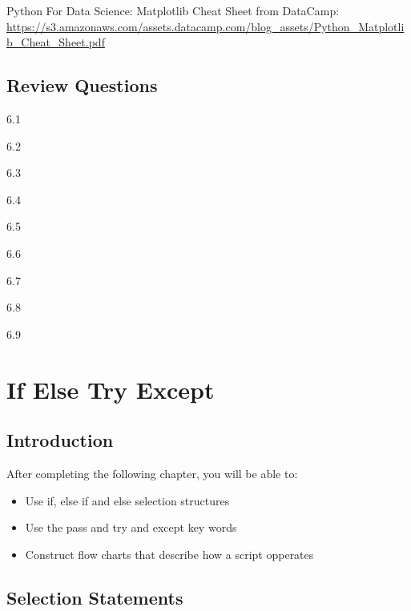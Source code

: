 \documentclass{book}
\begin{document}
Python For Data Science: Matplotlib Cheat Sheet from DataCamp:
\url{https://s3.amazonaws.com/assets.datacamp.com/blog_assets/Python_Matplotlib_Cheat_Sheet.pdf}
    




    
        \section{Review Questions}\label{review-questions}
    




    
        6.1

6.2

6.3

6.4

6.5

6.6

6.7

6.8

6.9
    




    
        \chapter{If Else Try Except}\label{if-else-try-except}
    




    
        \section{Introduction}\label{introduction}
    




    
        After completing the following chapter, you will be able to:

\begin{itemize}
\item
  Use if, else if and else selection structures
\item
  Use the pass and try and except key words
\item
  Construct flow charts that describe how a script opperates
\end{itemize}
    




    
        \section{Selection Statements}\label{selection-statements}
    
\end{document}
